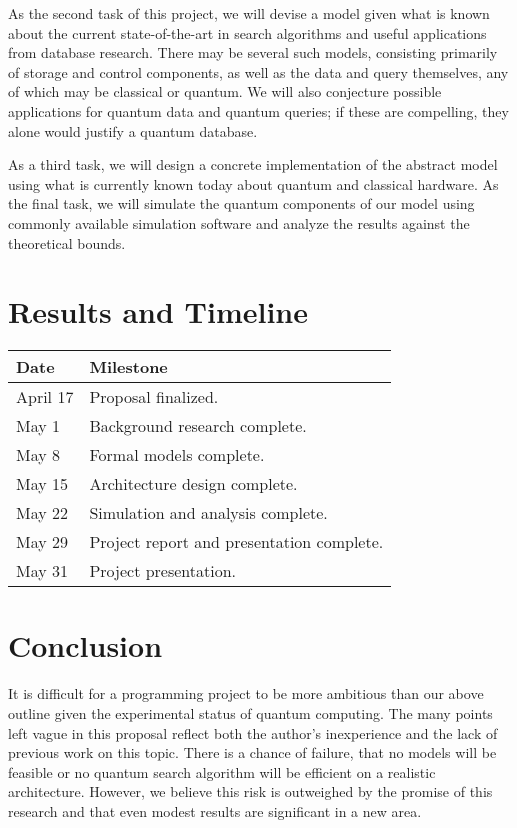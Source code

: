 \documentclass{toc}
\theoremstyle{plain}
\theoremstyle{definition}
\begin{document}
As the second task of this project, we will devise a model given what is
known about the current state-of-the-art in search algorithms and
useful applications from database research. There may be several such models,
consisting primarily of storage and control components, as well as the data
and query themselves, any of which may
be classical or quantum. We will also conjecture possible applications
for quantum data and quantum queries; if these are compelling, they alone
would justify a quantum database.

As a third task, we will design a concrete implementation of the abstract
model using what is currently known today about quantum and classical
hardware. As the final task, we will simulate the quantum components of
our model using commonly available simulation software and analyze the
results against the theoretical bounds.

\section{Results and Timeline}

\begin{center}
\begin{tabular}{|l|l|}
\hline
\textbf{Date} & \textbf{Milestone}\\
\hline
April 17 & Proposal finalized.\\
May   1  & Background research complete.\\
May   8  & Formal models complete.\\
May   15 & Architecture design complete.\\
May   22 & Simulation and analysis complete.\\
May   29 & Project report and presentation complete.\\
May   31 & Project presentation.\\
\hline
\end{tabular}
\end{center}

\section{Conclusion}

It is difficult for a programming project to be more ambitious than our
above outline given the experimental status of quantum computing. The many
points left vague in this proposal reflect both the author's inexperience and
the lack of previous work on this topic. There is a chance of failure, that
no models will be feasible or no quantum search algorithm will be efficient
on a realistic architecture. However, we believe this risk is outweighed by the
promise of this research and that even modest results are significant in a
new area.
\end{document}
